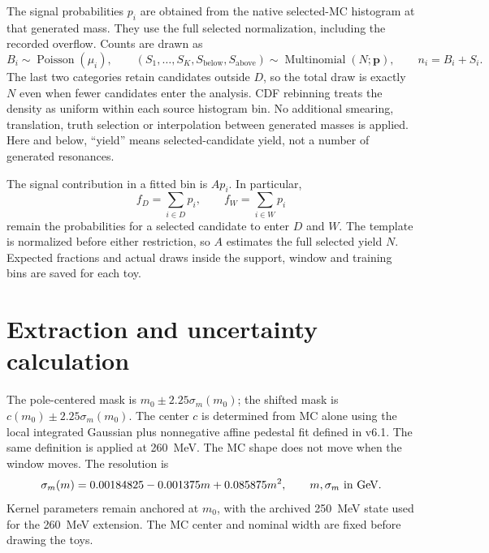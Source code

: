 \documentclass[11pt]{article}
\begin{document}
The signal probabilities $p_i$ are obtained from the native selected-MC
histogram at that generated mass. They use the full selected normalization,
including the recorded overflow. Counts are drawn as
\begin{equation}
 B_i\sim\operatorname{Poisson}(\mu_i),\qquad
 (S_1,\ldots,S_K,S_{\mathrm{below}},S_{\mathrm{above}})
 \sim\operatorname{Multinomial}(N;\bm p),\qquad n_i=B_i+S_i.
 \label{eq:toys}
\end{equation}
The last two categories retain candidates outside $D$, so the total
draw is exactly $N$ even when fewer candidates enter the analysis.
CDF rebinning treats the density as uniform within each source histogram
bin. No additional smearing, translation, truth selection or interpolation
between generated masses is applied. Here and below, ``yield'' means
selected-candidate yield, not a number of generated resonances.

The signal contribution in a fitted bin is $A p_i$. In particular,
\begin{equation}
 f_D=\sum_{i\in D}p_i,\qquad f_W=\sum_{i\in W}p_i
 \label{eq:fractions}
\end{equation}
remain the probabilities for a selected candidate to enter $D$ and $W$.
The template is normalized before either restriction, so $A$ estimates
the full selected yield $N$. Expected fractions and
actual draws inside the support, window and training bins are saved for
each toy.

\begin{table}[H]\centering\small

\caption{Fixed MC centers, nominal resolutions and selected fractions.
Masses, centers and resolutions are in MeV. P and C denote the pole- and
MC-core-centered masks. The asterisk marks the 260~MeV extension, which
uses the archived 250~MeV kernel state.}
\end{table}

\clearpage
\section{Extraction and uncertainty calculation}
The pole-centered mask is $m_0\pm2.25\sigma_m(m_0)$; the shifted mask is
$c(m_0)\pm2.25\sigma_m(m_0)$. The center $c$ is determined from MC alone
using the local integrated Gaussian plus nonnegative affine pedestal
fit defined in v6.1. The same definition is applied at 260~MeV.
The MC shape does not move when the window moves. The resolution is
\begin{equation}
 \sigma_m(m)=0.00184825-0.001375m+0.085875m^2,
 \qquad m,\sigma_m\ \hbox{in GeV}.
\end{equation}
Kernel parameters remain anchored at $m_0$, with the archived 250~MeV
state used for the 260~MeV extension. The MC center and nominal width
are fixed before drawing the toys.
\end{document}
